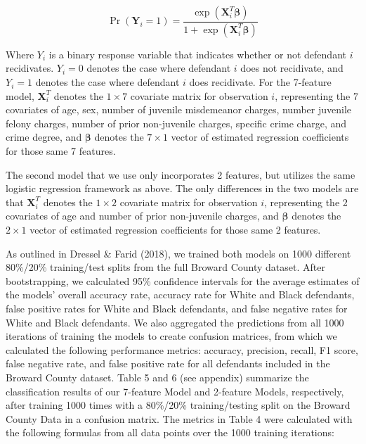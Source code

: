 \documentclass[12pt, ]{article}
\begin{document}
\[ \Pr(\boldsymbol{Y}_i = 1) =   \dfrac{\exp(\boldsymbol{X}_i^T\boldsymbol{\beta})}{1+\exp(\boldsymbol{X}_i^T\boldsymbol{\beta})} \]

Where \(Y_i\) is a binary response variable that indicates whether or
not defendant \(i\) recidivates. \(Y_i = 0\) denotes the case where
defendant \(i\) does not recidivate, and \(Y_i = 1\) denotes the case
where defendant \(i\) does recidivate. For the 7-feature model,
\(\boldsymbol{X}_i^T\) denotes the \(1 \times 7\) covariate matrix for
observation \(i\), representing the 7 covariates of age, sex, number of
juvenile misdemeanor charges, number juvenile felony charges, number of
prior non-juvenile charges, specific crime charge, and crime degree, and
\(\boldsymbol{\beta}\) denotes the \(7 \times 1\) vector of estimated
regression coefficients for those same 7 features.

The second model that we use only incorporates 2 features, but utilizes
the same logistic regression framework as above. The only differences in
the two models are that \(\boldsymbol{X}_i^T\) denotes the
\(1 \times 2\) covariate matrix for observation \(i\), representing the
2 covariates of age and number of prior non-juvenile charges, and
\(\boldsymbol{\beta}\) denotes the \(2 \times 1\) vector of estimated
regression coefficients for those same 2 features.

As outlined in Dressel \& Farid (2018), we trained both models on 1000
different 80\%/20\% training/test splits from the full Broward County
dataset. After bootstrapping, we calculated 95\% confidence intervals
for the average estimates of the models' overall accuracy rate, accuracy
rate for White and Black defendants, false positive rates for White and
Black defendants, and false negative rates for White and Black
defendants. We also aggregated the predictions from all 1000 iterations
of training the models to create confusion matrices, from which we
calculated the following performance metrics: accuracy, precision,
recall, F1 score, false negative rate, and false positive rate for all
defendants included in the Broward County dataset. Table 5 and 6 (see
appendix) summarize the classification results of our 7-feature Model
and 2-feature Models, respectively, after training 1000 times with a
80\%/20\% training/testing split on the Broward County Data in a
confusion matrix. The metrics in Table 4 were calculated with the
following formulas from all data points over the 1000 training
iterations:
\end{document}

